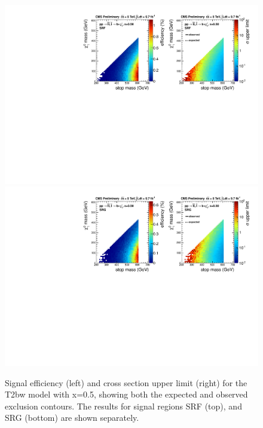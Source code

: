 \begin{figure}[hbt]
  \begin{center}
        \includegraphics[width=1.\linewidth]{plots/T2bw_x50_SRF.pdf}
        \includegraphics[width=1.\linewidth]{plots/T2bw_x50_SRG.pdf}
    \caption{Signal efficiency (left) and cross section upper limit
      (right) for the T2bw model with x=0.5, showing both the expected and
      observed exclusion contours. The results for signal regions SRF (top),
      and SRG (bottom) are shown separately.}
\label{fig:allsrlimits3T2bw0p5}
      \end{center}
\end{figure}


